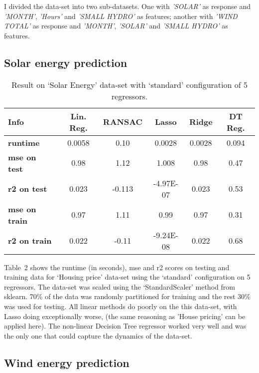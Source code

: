 \documentclass[12pt]{article}
\begin{document}
I divided the data-set into two sub-datasets. One with \textit{'SOLAR'} as response and \textit{'MONTH'}, \textit{'Hours'} and  \textit{'SMALL HYDRO'} as features; another with \textit{'WIND TOTAL'} as response and \textit{'MONTH'},  \textit{'SOLAR'} and \textit{'SMALL HYDRO'} as features.

\subsection*{Solar energy prediction}

\begin{table}[!hptb]
\centering
\begin{tabular}{|l|c|c|c|c|c|}
\hline
\textbf{Info} & \textbf{Lin. Reg.} & \textbf{RANSAC} & \textbf{Lasso} & \textbf{Ridge} & \textbf{DT Reg.}  \\\hline
\textbf{runtime} & 0.0058 & 0.10 & 0.0028 & 0.0028 & 0.094 \\
\textbf{mse on test} & 0.98 & 1.12 & 1.008 &	0.98 & 0.47 \\
\textbf{r2 on test} & 0.023 &	-0.113 & -4.97E-07 & 0.023 & 0.53 \\
\textbf{mse on train} & 0.97 & 1.11 &	0.99 & 0.97 & 0.31 \\
\textbf{r2 on train} & 0.022 & -0.11 &	-9.24E-08 & 0.022 & 0.68 \\\hline
\end{tabular}
\caption{Result on `Solar Energy' data-set with `standard' configuration of 5 regressors.}
\end{table}

Table~2 shows the runtime (in seconds), mse and r2 scores on testing and training data for `Housing price' data-set using the `standard' configuration on 5 regressors. The data-set was scaled using the `StandardScaler' method from sklearn. 70\% of the data was randomly partitioned for training and the rest 30\% was used for testing. All linear methods do poorly on the this data-set, with Lasso doing exceptionally worse, (the same reasoning as 'House pricing' can be applied here). The non-linear Decision Tree regressor worked very well and was the only one that could capture the dynamics of the data-set.

\subsection*{Wind energy prediction}
\end{document}
